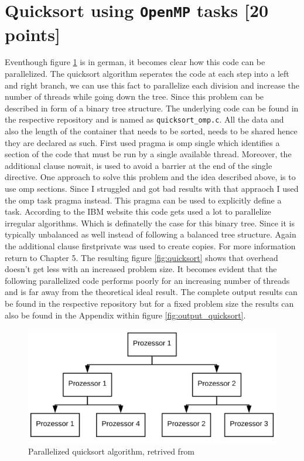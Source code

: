 \documentclass[unicode,11pt,a4paper,oneside,numbers=endperiod,openany]{scrartcl}
\begin{document}
\section{Quicksort using \texttt{OpenMP} tasks [20 points]}
\indent
Eventhough figure \ref{fig:parallel_quicksort} is in german, it becomes clear how this code 
can be parallelized. The quicksort algorithm seperates the code at each step into a left 
and right branch, we can use this fact to parallelize each division and increase the number 
of threads while going down the tree. Since this problem can be described in form of a binary 
tree structure.
\newline \indent
The underlying code can be found in the respective repository and is named as \texttt{quicksort\_omp.c}. All 
the data and also the length of the container that needs to be sorted, needs to be shared hence they are declared as 
such. First used pragma is omp single which identifies a section of the code that must be run by a single available thread.
Moreover, the additional clause nowait, is used to avoid a barrier at the end of the single directive. One 
approach to solve this problem and the idea described above, is to use omp sections. Since I struggled and got bad 
results with that appraoch I used the omp task pragma instead. This pragma can be used to explicitly define a 
task. According to the IBM website this code gets used a lot to parallelize irregular algorithms. Which is definatelly 
the case for this binary tree. Since it is typically unbalanced as well instead of following a balanced tree structure. 
Again the additional clause firstprivate was used to create copies. For more information return to Chapter 5.
\newline \indent
The resulting figure \ref{fig:quicksort} shows that overhead doesn't get less with an increased problem size. It becomes 
evident that the following parallelized code performs poorly for an increasing number of threads and is far away from the 
theoretical ideal result. The complete output results can be found in the respective repository but for a fixed problem size the 
results can also be found in the Appendix within figure \ref{fig:output_quicksort}.
\begin{figure}[H]
  \centering
  \includegraphics[width=\textwidth]{Images_Output/Parallel_Quicksort.png}
  \caption{Parallelized quicksort algorithm, retrived from \cite{parallelized_quicksort}}
  \label{fig:parallel_quicksort}
\end{figure}
\end{document}
